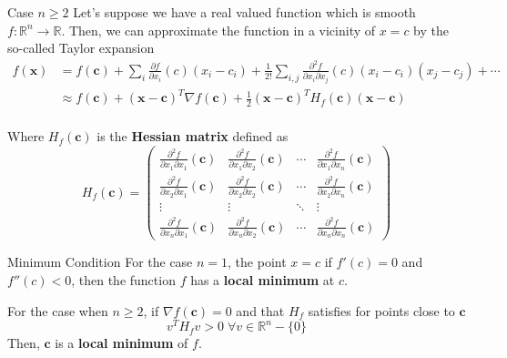 \documentclass{beamer}
\begin{document}
	\begin{frame}{Case $n\ge 2$}
	Let's suppose we have a real valued function which is smooth $f\colon \mathbb{R}^n\to \mathbb{R}$. Then, we can approximate the function in a vicinity of $x=c$ by the so-called Taylor expansion
	\begin{equation*}
		\begin{split}
	f(\textbf{x}) &= f(\textbf{c})+ \sum_i \frac{\partial f}{\partial x_i}(c) (x_i-c_i)+  \frac{1}{2!} \sum_{i,j}\frac{\partial^2f}{\partial x_i \partial x_j}(c) (x_i-c_i)(x_j-c_j) +   \cdots\\
	&\approx f(\textbf{c})+ (\textbf{x}-\textbf{c})^T \nabla f(\textbf{c})+ \frac{1}{2} (\textbf{x}-\textbf{c})^T H_f(\textbf{c}) (\textbf{x}-\textbf{c})\\
		\end{split}
	\end{equation*}


	Where $H_f(\textbf{c})$ is the \textbf{Hessian matrix} defined as 
	\begin{equation*}
		H_f(\textbf{c})= \begin{pmatrix}
			\frac{\partial^2 f}{\partial x_1 \partial x_1} (\textbf{c}) & 	\frac{\partial^2 f}{\partial x_1 \partial x_2} (\textbf{c}) & \cdots & 	\frac{\partial^2 f}{\partial x_1 \partial x_n} (\textbf{c}) \\
				\frac{\partial^2 f}{\partial x_2 \partial x_1} (\textbf{c})  & 	\frac{\partial^2 f}{\partial x_2 \partial x_2} (\textbf{c}) & \cdots & 	\frac{\partial^2 f}{\partial x_2\partial x_n} (\textbf{c})\\
				\vdots & \vdots & \ddots & \vdots\\
					\frac{\partial^2 f}{\partial x_n \partial x_1} (\textbf{c}) & 	\frac{\partial^2 f}{\partial x_n  \partial x_2} (\textbf{c}) & \cdots &	\frac{\partial^2 f}{\partial x_n \partial x_n} (\textbf{c})      
		\end{pmatrix}
	\end{equation*}
\end{frame}

\begin{frame}{Minimum Condition}
	For the case $n=1$, the point $x=c$ if $f'(c)=0$ and $f''(c)<0$, then the function $f$ has a \textbf{local minimum} at $c$. 
	
	For the case when $n\ge 2$, if $\nabla f(\textbf{c})=0$ and that $H_f$ satisfies for points close to $\textbf{c}$
	\begin{equation*}
		v^T H_f  v >0 \; \forall v \in \mathbb{R}^n -\{0\}
	\end{equation*}
	Then, $\textbf{c}$ is a \textbf{local minimum} of $f$.
\end{frame}
	
\end{document}
